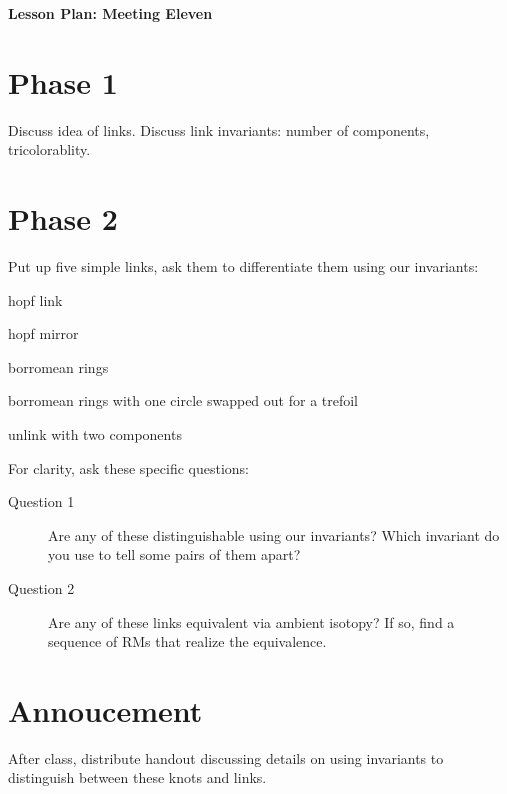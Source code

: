 \documentclass[12pt]{amsart}
\theoremstyle{definition}
\begin{document}
\begin{center}
\textbf{\Huge
Lesson Plan: Meeting Eleven
}
\end{center}
\vspace{.5in}

\section*{Phase 1}
Discuss idea of links.
Discuss link invariants: number of components, tricolorablity. 

\section*{Phase 2}
Put up five simple links, ask them to differentiate them using our invariants:
\begin{compactenum}
\item hopf link
\item hopf mirror
\item borromean rings
\item borromean rings with one circle swapped out for a trefoil
\item unlink with two components\\
\end{compactenum}

For clarity, ask these specific questions:
\begin{description}
\item[Question 1]  Are any of these distinguishable using our invariants? Which invariant do you use to tell some pairs of them apart?

\item[Question 2] Are any of these links equivalent via ambient isotopy? If so, find a sequence of RMs that realize the equivalence.
\end{description}

\section*{Annoucement}
After class, distribute handout discussing details on using invariants to distinguish between these knots and links.
\end{document}
